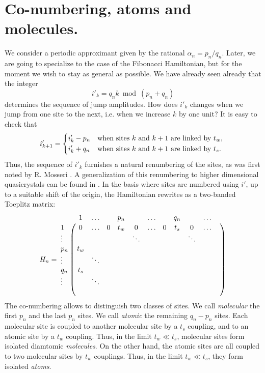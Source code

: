\documentclass[aps,prl,preprint]{revtex4-1}
\begin{document}
\section{Co-numbering, atoms and molecules.}

We consider a periodic approximant given by the rational $\alpha_n = p_n/q_n$. Later, we are going to specialize to the case of the Fibonacci Hamiltonian, but for the moment we wish to stay as general as possible.
We have already seen already that the integer
\begin{equation}
	i'_k = q_n k \bmod(p_n+q_n)
\end{equation}
determines the sequence of jump amplitudes. How does $i'_k$ changes when we jump from one site to the next, i.e. when we increase $k$ by one unit? It is easy to check that
\begin{equation}
	i'_{k+1} = \begin{dcases*}
	i'_k - p_n & when sites $k$ and $k+1$ are linked by $t_w$, \\
	i'_k + q_n & when sites $k$ and $k+1$ are linked by $t_s$.
	\end{dcases*}
\end{equation}
Thus, the sequence of $i'_k$ furnishes a natural renumbering of the sites, as was first noted by R. Mosseri \cite{Moss}. A generalization of this renumbering to higher dimensional quasicrystals can be found in \cite{MossSire}.
In the basis where sites are numbered using $i'$, up to a suitable shift of the origin, the Hamiltonian rewrites as a two-banded Toeplitz matrix:
\begin{equation}
	H_n = 
	\bordermatrix{ 
	 	& 1 	&	\ldots & & p_n	& &  \ldots &	& q_n &	& \ldots	&  \cr
    1 	& 0 		& \ldots & 0 & t_w & 0	& \ldots & 0 & t_s	& 0 		& \ldots		 \cr
    \vdots & & & & & \ddots	& & & & \ddots & \cr
    p_n & t_w \cr
    \vdots & & \ddots \cr
    q_n & t_s \cr
    \vdots & & \ddots \cr
     & 
    }
\end{equation}
The co-numbering allows to distinguish two classes of sites. We call \emph{molecular} the first $p_n$ and the last $p_n$ sites. We call \emph{atomic} the remaining $q_n - p_n$ sites.
Each molecular site is coupled to another molecular site by a $t_s$ coupling, and to an atomic site by a $t_w$ coupling. Thus, in the limit $t_w \ll t_s$, molecular sites form isolated diamtomic \emph{molecules}. 
On the other hand, the atomic sites are all coupled to two molecular sites by $t_w$ couplings. Thus, in the limit $t_w \ll t_s$, they form isolated \emph{atoms}.
\end{document}
